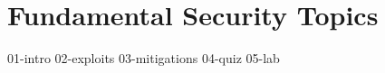 \chapter{Fundamental Security Topics}

{01-intro}
{02-exploits}
{03-mitigations}
{04-quiz}
{05-lab}


